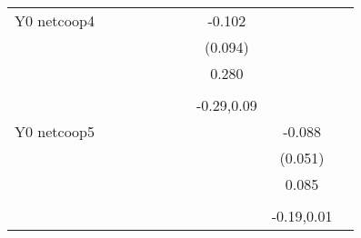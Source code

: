 \begin{table}[!h]
\begin{adjustbox}{width=\columnwidth,center}
\begin{tabular}{l*{8}{c}}
Y0 netcoop4         &                     &                     &                     &                     &                     &                     &      -0.102         &                     &                     &                     \\
                    &                     &                     &                     &                     &                     &                     &     (0.094)         &                     &                     &                     \\
                    &                     &                     &                     &                     &                     &                     &       0.280         &                     &                     &                     \\
                    &                     &                     &                     &                     &                     &                     &                     &                     &                     &                     \\
                    &                     &                     &                     &                     &                     &                     &  -0.29,0.09         &                     &                     &                     \\
Y0 netcoop5         &                     &                     &                     &                     &                     &                     &                     &      -0.088\sym{*}  &                     &                     \\
                    &                     &                     &                     &                     &                     &                     &                     &     (0.051)         &                     &                     \\
                    &                     &                     &                     &                     &                     &                     &                     &       0.085         &                     &                     \\
                    &                     &                     &                     &                     &                     &                     &                     &                     &                     &                     \\
                    &                     &                     &                     &                     &                     &                     &                     &  -0.19,0.01         &                     &                     \\

\end{tabular}
\end{adjustbox}
\end{table}
